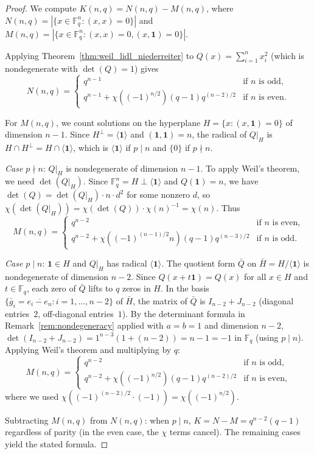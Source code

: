 \documentclass[11pt]{article}
\newcommand{\FF}{\mathbb{F}}
\newcommand{\0}{\mathbf{0}}
\newcommand{\1}{\mathbf{1}}
\theoremstyle{plain}
\theoremstyle{definition}
\theoremstyle{remark}
\begin{document}
\begin{proof}
We compute $K(n,q) = N(n,q) - M(n,q)$, where $N(n,q) = |\{x \in \FF_q^n : (x,x) = 0\}|$ and $M(n,q) = |\{x \in \FF_q^n : (x,x) = 0, (x,\1) = 0\}|$.

Applying Theorem~\ref{thm:weil_lidl_niederreiter} to $Q(x) = \sum_{i=1}^n x_i^2$ (which is nondegenerate with $\det(Q) = 1$) gives
$$
N(n,q) = \begin{cases}
q^{n-1} & \text{if } n \text{ is odd,} \\
q^{n-1} + \chi((-1)^{n/2})(q-1)q^{(n-2)/2} & \text{if } n \text{ is even.}
\end{cases}
$$

For $M(n,q)$, we count solutions on the hyperplane $H = \{x : (x,\1) = 0\}$ of dimension $n-1$. Since $H^\perp = \langle \1 \rangle$ and $(\1,\1) = n$, the radical of $Q|_H$ is $H \cap H^\perp = H \cap \langle \1 \rangle$, which is $\langle \1 \rangle$ if $p \mid n$ and $\{0\}$ if $p \nmid n$.

\emph{Case $p \nmid n$}: $Q|_H$ is nondegenerate of dimension $n-1$. To apply Weil's theorem, we need $\det(Q|_H)$. Since $\FF_q^n = H \perp \langle \1 \rangle$ and $Q(\1) = n$, we have $\det(Q) = \det(Q|_H) \cdot n \cdot d^2$ for some nonzero $d$, so $\chi(\det(Q|_H)) = \chi(\det(Q)) \cdot \chi(n)^{-1} = \chi(n)$. Thus
$$
M(n,q) = \begin{cases}
q^{n-2} & \text{if } n \text{ is even,} \\
q^{n-2} + \chi((-1)^{(n-1)/2} n)(q-1)q^{(n-3)/2} & \text{if } n \text{ is odd.}
\end{cases}
$$

\emph{Case $p \mid n$}: $\1 \in H$ and $Q|_H$ has radical $\langle \1 \rangle$. The quotient form $\bar{Q}$ on $\bar{H} = H/\langle \1 \rangle$ is nondegenerate of dimension $n-2$. Since $Q(x + t\1) = Q(x)$ for all $x \in H$ and $t \in \FF_q$, each zero of $\bar{Q}$ lifts to $q$ zeros in $H$. In the basis $\{\bar{g}_i = \overline{e_i - e_n} : i = 1, \ldots, n-2\}$ of $\bar{H}$, the matrix of $\bar{Q}$ is $I_{n-2} + J_{n-2}$ (diagonal entries~$2$, off-diagonal entries~$1$). By the determinant formula in Remark~\ref{rem:nondegeneracy} applied with $a = b = 1$ and dimension $n-2$, $\det(I_{n-2} + J_{n-2}) = 1^{n-3}(1 + (n-2)) = n - 1 = -1$ in $\FF_q$ (using $p \mid n$). Applying Weil's theorem and multiplying by $q$:
$$
M(n,q) = \begin{cases}
q^{n-2} & \text{if } n \text{ is odd,} \\
q^{n-2} + \chi((-1)^{n/2})(q-1)q^{(n-2)/2} & \text{if } n \text{ is even,}
\end{cases}
$$
where we used $\chi((-1)^{(n-2)/2} \cdot (-1)) = \chi((-1)^{n/2})$.

Subtracting $M(n,q)$ from $N(n,q)$: when $p \mid n$, $K = N - M = q^{n-2}(q-1)$ regardless of parity (in the even case, the $\chi$ terms cancel). The remaining cases yield the stated formula.
\end{proof}
\end{document}
